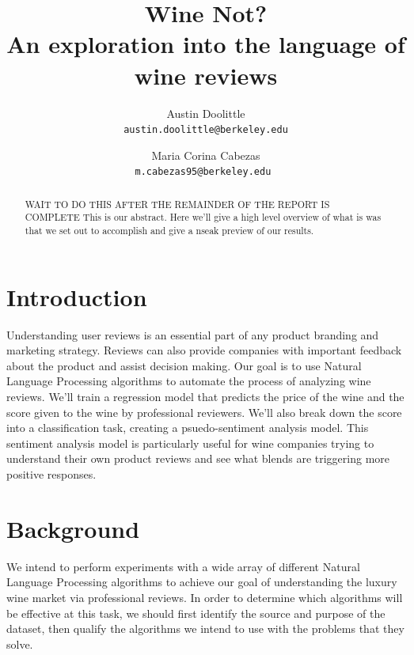 \documentclass[11pt]{article}
\title{
    Wine Not? \\
    \large An exploration into the language of wine reviews
}
\author{
    Austin Doolittle \\
    \texttt{austin.doolittle@berkeley.edu}
    \and
    Maria Corina Cabezas \\
    \texttt{m.cabezas95@berkeley.edu }
}
\begin{document}
\maketitle
\begin{abstract}
    WAIT TO DO THIS AFTER THE REMAINDER OF THE REPORT IS COMPLETE
    This is our abstract. Here we'll give a high level overview of what is was that we set out to accomplish and give a nseak preview of our results.
\end{abstract}

\section{Introduction}
    Understanding user reviews is an essential part of any product branding and marketing strategy. Reviews can also provide companies with important feedback about the product and assist decision making. Our goal is to use Natural Language Processing algorithms to automate the process of analyzing wine reviews. We'll train a regression model that predicts the price of the wine and the score given to the wine by professional reviewers. We'll also break down the score into a classification task, creating a psuedo-sentiment analysis model. This sentiment analysis model is particularly useful for wine companies trying to understand their own product reviews and see what blends are triggering more positive responses. 

\section{Background}
    We intend to perform experiments with a wide array of different Natural Language Processing algorithms to achieve our goal of understanding the luxury wine market via professional reviews. In order to determine which algorithms will be effective at this task, we should first identify the source and purpose of the dataset, then qualify the algorithms we intend to use with the problems that they solve.
\end{document}
